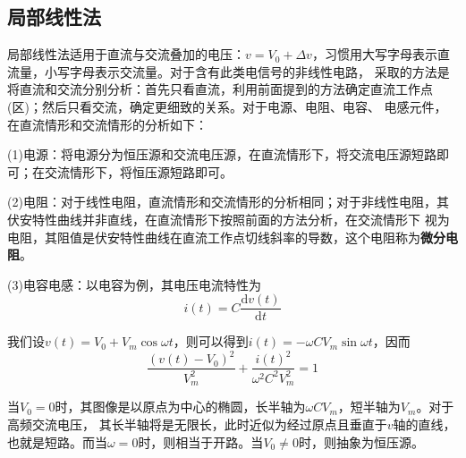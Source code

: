 \documentclass[UTF8,openany]{ctexbook}
\begin{document}
    \subsection{局部线性法}
    \par 局部线性法适用于直流与交流叠加的电压：$v=V_0+\Delta v$，习惯用大写字母表示直流量，小写字母表示交流量。对于含有此类电信号的非线性电路，
    采取的方法是将直流和交流分别分析：首先只看直流，利用前面提到的方法确定直流工作点(区)；然后只看交流，确定更细致的关系。对于电源、电阻、电容、
    电感元件，在直流情形和交流情形的分析如下：
    \par (1)电源：将电源分为恒压源和交流电压源，在直流情形下，将交流电压源短路即可；在交流情形下，将恒压源短路即可。
    \par (2)电阻：对于线性电阻，直流情形和交流情形的分析相同；对于非线性电阻，其伏安特性曲线并非直线，在直流情形下按照前面的方法分析，在交流情形下
    视为电阻，其阻值是伏安特性曲线在直流工作点切线斜率的导数，这个电阻称为\textbf{微分电阻}。
    \begin{center}
    \end{center}
    \par (3)电容电感：以电容为例，其电压电流特性为
    \[
    i(t)=C\frac{\mathrm{d}v(t)}{\mathrm{d}t}    
    \]
    \par 我们设$v(t)=V_0+V_m\cos\omega t$，则可以得到$i(t)=-\omega C V_m\sin\omega t$，因而
    \[
    \frac{(v(t)-V_0)^2}{V_m^2}+\frac{i(t)^2}{\omega^2C^2V_m^2}=1    
    \]
    \par 当$V_0=0$时，其图像是以原点为中心的椭圆，长半轴为$\omega CV_m$，短半轴为$V_m$。对于高频交流电压，
    其长半轴将是无限长，此时近似为经过原点且垂直于$v$轴的直线，也就是短路。而当$\omega=0$时，则相当于开路。当$V_0\neq 0$时，则抽象为恒压源。
    \begin{center}
    \end{center}
\end{document}
